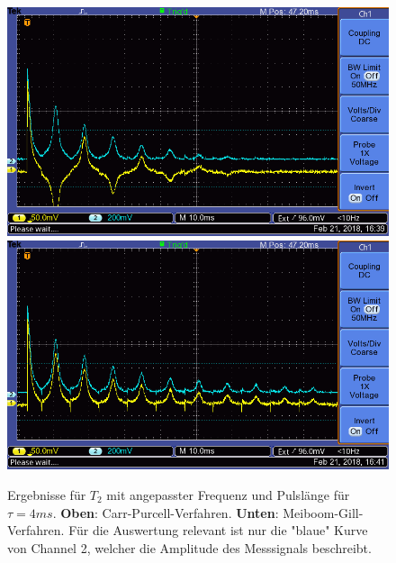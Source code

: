 \documentclass[12pt,a4paper]{article}
\begin{document}
\begin{figure}
\centering
\includegraphics[scale=0.8]{Bilder/T2CPalt.png}
\includegraphics[scale=0.8]{Bilder/T2MGalt.png}
\caption{Ergebnisse für $T_2$ mit angepasster Frequenz und Pulslänge für $\tau = 4ms$. \textbf{Oben}: Carr-Purcell-Verfahren. \textbf{Unten}: Meiboom-Gill-Verfahren. Für die Auswertung relevant ist nur die "blaue" Kurve von Channel 2, welcher die Amplitude des Messsignals beschreibt.}
\label{fig:T2Datenalt}
\end{figure}
\end{document}
